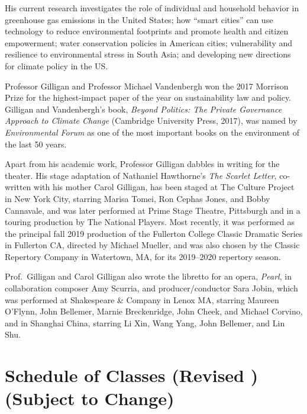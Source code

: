 \documentclass[11pt,twoside]{jgsyllabus}\usepackage[]{graphicx}\usepackage[]{color}
\begin{document}
His current research investigates the role of individual and household behavior
in greenhouse gas emissions in the United States;
how ``smart cities'' can use technology to reduce environmental footprints and
promote health and citizen empowerment;
water conservation policies in American cities;
vulnerability and resilience to environmental stress in South Asia;
and developing new directions for climate policy in the US.

Professor Gilligan and Professor Michael Vandenbergh won
the 2017 Morrison Prize for the highest-impact paper of the year
on sustainability law and policy.
Gilligan and Vandenbergh's book,
\emph{Beyond Politics: The Private Governance Approach to Climate Change\/}
(Cambridge University Press, 2017),
was named by \emph{Environmental Forum\/} as one of the most
important books on the environment of the last 50 years.

Apart from his academic work, Professor Gilligan dabbles in writing for the
theater. His stage adaptation of Nathaniel Hawthorne's \emph{The Scarlet Letter},
co-written with his mother Carol Gilligan, has been staged at The Culture
Project in New York City, starring
Marisa Tomei, Ron Cephas Jones, and Bobby Cannavale, and was later performed
at Prime Stage Theatre, Pittsburgh and in a touring production by The National
Players. Most recently, it was performed as the principal fall 2019 production
of the Fullerton College Classic Dramatic Series in Fullerton CA,
directed by Michael Mueller,
and was also chosen by the Classic Repertory Company in Watertown, MA,
for its 2019--2020 repertory season.

Prof.\ Gilligan and Carol Gilligan also wrote the libretto for an opera,
\emph{Pearl}, in collaboration composer Amy Scurria, and producer/conductor
Sara Jobin, which was performed at Shakespeare \& Company in Lenox MA,
starring Maureen O'Flynn, John Bellemer, Marnie Breckenridge, John Cheek,
and Michael Corvino, and in Shanghai China,
starring Li Xin, Wang Yang, John Bellemer, and Lin Shu.
%
%
%
%
%
%

\clearpage
\cleardoublepage
\appendix
\setcounter{secnumdepth}{0}
\newcommand{\maybehline}{\hline}%
\setlength\extrarowheight{4pt}
\section[Class Schedule]{Schedule of Classes
\ifrevised
	(Revised \RevisionDate)%
\else
	(Subject to Change)%
\fi}
\end{document}
